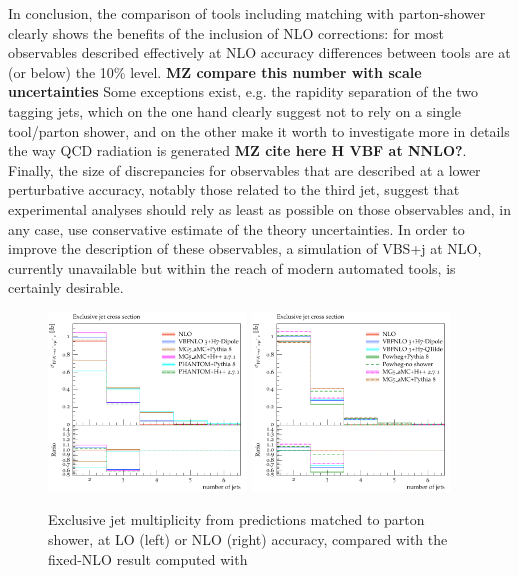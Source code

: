 In conclusion, the comparison of tools including matching with parton-shower clearly shows the benefits of the inclusion of NLO corrections: for most observables described
effectively at NLO accuracy differences between tools are at (or below) the 10\% level. {\bf MZ compare this number with scale uncertainties} 
Some exceptions exist, e.g. the rapidity separation of the two tagging jets, which
on the one hand clearly suggest not to rely on a single tool/parton shower, and on the other make it worth to investigate more in details the way QCD radiation is 
generated {\bf MZ cite here H VBF at NNLO?}. Finally, the size of discrepancies for observables that are described at a lower perturbative accuracy, notably those related to the third jet, suggest that 
experimental analyses should rely as least as possible on those observables and, in any case, use conservative estimate of the theory uncertainties. In order to improve the
description of these observables, a simulation of VBS+j at NLO, currently unavailable but within the reach of modern automated tools, is certainly desirable.

\begin{figure}[hbt]
\centering
\includegraphics[width=0.47\textwidth]{figures/LOPS/jetsexclusive.pdf}
\includegraphics[width=0.47\textwidth]{figures/NLOPS/jetsexclusive.pdf}
\caption{Exclusive jet multiplicity from predictions matched to parton shower, at LO (left) or NLO (right) accuracy, compared with the fixed-NLO result
    computed with }
\label{fig:PSnjet}
\end{figure}

